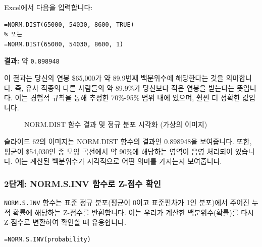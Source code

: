 \documentclass[11pt,a4paper]{article}
\theoremstyle{definition}
\begin{document}
\begin{examplebox}[title=NORM.DIST 함수 적용]
Excel에서 다음을 입력합니다:
\begin{lstlisting}[language=Excel, caption={NORM.DIST 함수를 이용한 백분위수 계산}, label={lst:norm_dist_example}]
=NORM.DIST(65000, 54030, 8600, TRUE)
% 또는
=NORM.DIST(65000, 54030, 8600, 1)
\end{lstlisting}
\textbf{결과:} 약 \texttt{0.898948}

이 결과는 당신의 연봉 \$65,000가 약 89.9번째 백분위수에 해당한다는 것을 의미합니다. 즉, 유사 직종의 다른 사람들의 약 89.9\%가 당신보다 적은 연봉을 받는다는 뜻입니다. 이는 경험적 규칙을 통해 추정한 70\%-95\% 범위 내에 있으며, 훨씬 더 정확한 값입니다.

\begin{figure}[h!]
    \centering
    \caption{NORM.DIST 함수 결과 및 정규 분포 시각화 (가상의 이미지)}
    \label{fig:norm_dist_output}
\end{figure}
\begin{infobox}[title=가상의 이미지 설명: NORM.DIST 함수 결과]
슬라이드 62의 이미지는 NORM.DIST 함수의 결과인 0.898948을 보여줍니다. 또한, 평균이 \$54,030인 종 모양 곡선에서 약 90\%에 해당하는 영역이 음영 처리되어 있습니다. 이는 계산된 백분위수가 시각적으로 어떤 의미를 가지는지 보여줍니다.
\end{infobox}
\end{examplebox}

\subsubsection*{2단계: NORM.S.INV 함수로 Z-점수 확인}

\texttt{NORM.S.INV} 함수는 표준 정규 분포(평균이 0이고 표준편차가 1인 분포)에서 주어진 누적 확률에 해당하는 Z-점수를 반환합니다. 이는 우리가 계산한 백분위수(확률)를 다시 Z-점수로 변환하여 확인할 때 유용합니다.

\begin{lstlisting}[caption={NORM.S.INV 함수 사용법}, label={lst:norm_s_inv}]
=NORM.S.INV(probability)
\end{lstlisting}
\end{document}
